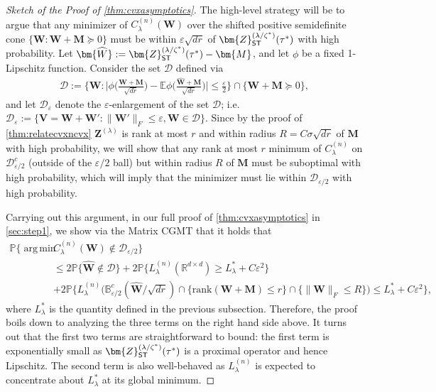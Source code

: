 \documentclass[10pt]{article}
\DeclareMathOperator*{\argmin}{arg\,min}
\newcommand{\eps}{\ensuremath{\varepsilon}}
\newcommand{\s}{^*}
\newcommand{\p}{\mathbb{P}}
\renewcommand{\hat}{\widehat}
\theoremstyle{definition}
\begin{document}
\begin{proof}[Sketch of the Proof of \cref{thm:cvxasymptotics}]
    The high-level strategy will be to argue that any minimizer of $C_{\lambda}^{(n)}(\bm{W})$ over the shifted positive semidefinite cone $\{\bm{W}: \bm{W} + \bm{M} \succcurlyeq 0 \}$ must be within $\eps \sqrt{dr}$ of $\bm{ Z}_{{\sf ST}}^{(\lambda/\zeta\s)}(\tau\s)$ with high probability.  
Let $\bm{\hat W} := \bm{ Z}_{{\sf ST}}^{(\lambda/\zeta\s)}(\tau\s)- \bm{M}$, and let $\phi$ be a fixed 1-Lipschitz function. Consider the set $\mathcal{D}$ defined via
\begin{align}
    \mathcal{D} := \bigg\{ \bm{W} :\bigg| \phi\bigg( \frac{\bm{W} + \bm{M}}{\sqrt{dr}}\bigg) - \mathbb{E} \phi\bigg( \frac{\bm{\hat W} + \bm{M}}{\sqrt{dr}} \bigg) \bigg|\leq \frac{\eps}{2} \bigg\} \cap \bigg\{ \bm{W} + \bm{M} \succcurlyeq 0 \bigg\},
\end{align}
and let $\mathcal{D}_{\eps}$ denote the $\eps$-enlargement of the set $\mathcal{D}$; i.e. $\mathcal{D}_{\eps} := \{ \bm{V} = \bm{W} + \bm{W}': \| \bm{W}' \|_F \leq \eps, \bm{W} \in \mathcal{D}\}$.  Since by the proof of \cref{thm:relatecvxncvx} $\bm{Z}^{(\lambda)}$ is rank at most $r$ and within radius $R = C \sigma \sqrt{dr}$ of $\bm{M}$ with high probability, we will show that any rank at most $r$ minimum of $C^{(n)}_{\lambda}$ on $\mathcal{D}_{\eps/2}^c$ (outside of the $\eps/2$ ball) but within radius $R$ of $\bm{M}$ must be suboptimal with high probability, which will imply that the minimizer must lie within $\mathcal{D}_{\eps/2}$ with high probability. 


Carrying out this argument, in our full proof of \cref{thm:cvxasymptotics} in \cref{sec:step1}, we show via the Matrix CGMT that it holds that
\begin{align}
    \p\bigg\{ \argmin ~ &C^{(n)}_{\lambda}(\bm{W}) \notin \mathcal{D}_{\eps/2} \bigg\} \\
    &\leq 2 \p\bigg\{ \bm{\hat W} \notin \mathcal{D} \bigg\}+ 2 \p\bigg\{ L_{\lambda}^{(n)}( \mathbb{R}^{d\times d}) \geq L_{\lambda}^* + C \eps^2 \bigg\} \\
    &+ 2 \p\bigg\{ L_{\lambda}^{(n)}\bigg( \mathbb{B}_{\eps/2}^c(\bm{\hat W}/\sqrt{dr}) \cap \{\mathrm{rank}(\bm{W + M}) \leq r \} \cap \{\| \bm{W}\|_F \leq R\} \bigg)  \leq L_{\lambda}^* + C \eps^2 \bigg\},
\end{align}
where $L_{\lambda}^*$ is the quantity defined in the previous subsection. Therefore, the proof boils down to analyzing the three terms on the right hand side above. It turns out that the first two terms are straightforward to bound: the first term is exponentially small as $\bm{Z}^{(\lambda/\zeta\s)}_{{\sf ST}}(\tau\s)$ is a proximal operator and hence Lipschitz.  The second term is also well-behaved as $L_{\lambda}^{(n)}$ is expected to concentrate about $L_{\lambda}^*$  at its global minimum.


\end{proof}
\end{document}
